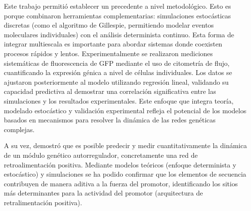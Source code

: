 \documentclass[nochap]{config/ejercicios}
\begin{document}
Este trabajo permitió establecer un precedente a nivel metodológico. Esto es porque combinaron herramientas complementarias: simulaciones estocásticas discretas (como el algoritmo de Gillespie, permitiendo modelar eventos moleculares individuales) con el análisis determinista continuo. Esta forma de integrar multiescala es importante para abordar sistemas donde coexisten procesos rápidos y lentos. Experimentalmente se realizaron mediciones sistemáticas de fluorescencia de GFP mediante el uso de citometría de flujo, cuantificando la expresión génica a nivel de células individuales. Los datos se ajustaron posteriormente al modelo utilizando regresión lineal, validando su capacidad predictiva al demostrar una correlación significativa entre las simulaciones y los resultados experimentales. Este enfoque que integra teoría, modelado estocástico y validación experimental refleja el potencial de los modelos basados en mecanismos para resolver la dinámica de las redes genéticas complejas.


A su vez, demostró que es posible predecir y medir cuantitativamente la dinámica de un módulo genético autorregulador, concretamente una red de retroalimentación positiva. Mediante modelos teóricos (enfoque determinista y estocástico) y simulaciones se ha podido confirmar que los elementos de secuencia contribuyen de manera aditiva a la fuerza del promotor, identificando los sitios más determinantes para la actividad del promotor (arquitectura de retralimentación positiva).


\end{document}
